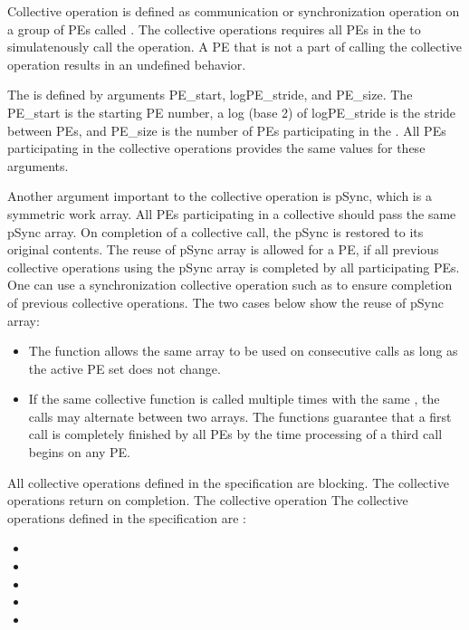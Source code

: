 Collective operation is defined as communication or synchronization operation 
on a group of \ac{PE}s called \activeset{}. The collective operations requires all
\ac{PE}s in the \activeset{} to simulatenously call the operation. 
A \ac{PE} that is not a part of \activeset{} calling the collective 
operation results in an undefined behavior.

The \activeset{} is defined by arguments PE\_start, logPE\_stride, 
and PE\_size. The PE\_start is the starting \ac{PE} number, a log (base 2) of logPE\_stride 
is the stride between \ac{PE}s, and PE\_size is the number of \ac{PE}s 
participating in the \activeset{}. All \ac{PE}s participating in the 
collective operations provides the same values for these arguments. 
 
Another argument important to the collective operation is pSync, which is a symmetric work 
array. All \ac{PE}s participating in a collective should pass the same
pSync array. On completion of a collective call, the pSync is restored to its 
original contents. The reuse of pSync array is allowed for a \ac{PE}, if all previous collective 
operations using the pSync array is completed by all participating 
\ac{PE}s. One can use a synchronization collective operation such as \barrier{}
to ensure completion of previous collective operations. The two cases below
show the reuse of pSync array:

\begin{itemize}
\item The  function allows the same  array to be used
          on consecutive calls as long as the active \ac{PE} set does not change.
\item  If the same collective function is called multiple times with the
          same \activeset, the calls may alternate between two  arrays.
          The \openshmem functions guarantee that a first call is completely finished by 
          all \ac{PE}s by the time processing of a third  call  begins  on
          any \ac{PE}.          
\end{itemize}


All collective operations defined in the specification are blocking. The 
collective operations return on completion. The collective operation 
The collective operations defined in the \openshmem{} specification 
are :

\begin{itemize}
\item[] \broadcast{} 
\item[] \barrier{}
\item[] \barrierall{}
\item[] \collect{}
\item[] \reduction{} 
\end{itemize} 

